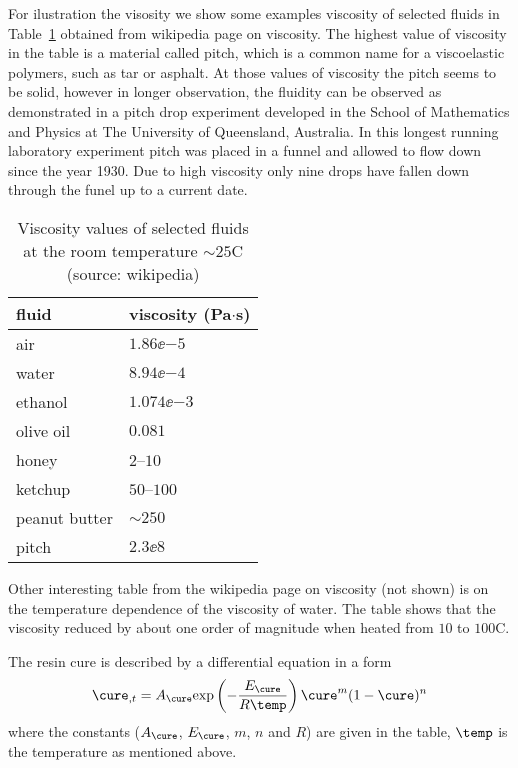 \documentclass[twoside,a4paper,12pt]{article}
\newcommand{\tabref}[1]{Table~\ref{#1}}
\begin{document}
For ilustration the visosity we show some examples viscosity of
selected fluids in \tabref{tab:viscos-example} obtained from wikipedia
page on viscosity. The highest value of viscosity in the table is a
material called pitch, which is a common name for a viscoelastic
polymers, such as tar or asphalt. At those values of viscosity the
pitch seems to be solid, however in longer observation, the fluidity
can be observed as demonstrated in a pitch drop experiment developed
in the School of Mathematics and Physics at The University of
Queensland, Australia. In this longest running laboratory experiment
pitch was placed in a funnel and allowed to flow down since the year
1930. Due to high viscosity only nine drops have fallen down through
the funel up to a current date.

\begin{table}
  \centering
  \begin{tabular}{ll}
    \toprule
    fluid         & viscosity (Pa$\cdot$s) \\
    \midrule
    air           & $1.86\ee{-5}$          \\
    water         & $8.94\ee{-4}$          \\
    ethanol       & $1.074\ee{-3}$         \\ 
    olive oil     & $0.081$                \\
    honey         & $2$--$10$              \\
    ketchup       & $50$--$100$            \\
    peanut butter & $\sim 250$             \\
    pitch         & $2.3\ee{8}$            \\
    \bottomrule
  \end{tabular}
  \caption{Viscosity values of selected fluids at the room temperature $\sim 25$\degree C (source: wikipedia)}
  \label{tab:viscos-example}
\end{table}

Other interesting table from the wikipedia page on viscosity (not
shown) is on the temperature dependence of the viscosity of water. The
table shows that the viscosity reduced by about one order of magnitude
when heated from $10$ to $100$\degree C.  


The resin cure is described by a differential equation in a form
%
\begin{align}
  \cure_{,t} =  A_\cure \exp{-\frac{E_\cure }{R\temp}} \cure^m (1-\cure)^n \label{eq:cure}
\end{align}
%
where the constants ($A_\cure$, $E_\cure$, $m$, $n$ and $R$) are
given in the table, $\temp$ is the temperature as mentioned above.
\end{document}
